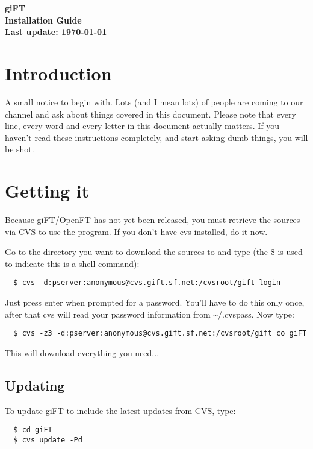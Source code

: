 \documentclass[10pt]{article}
\begin{document}
\begin{center}
\textsf{\textbf{\Huge{giFT}\\ \huge{Installation Guide}\\
\normalsize{Last update: \today}}}
\end{center}

\tableofcontents

\setlength{\parskip}{1.4ex}

\section{Introduction}
A small notice to begin with. Lots (and I mean lots) of people are
coming to our channel and ask about things covered in this
document. Please note that every line, every word and every letter
in this document actually matters. If you haven't read these
instructions completely, and start asking dumb things, you will be
shot.

\section{Getting it}

Because giFT/OpenFT has not yet been released, you must retrieve
the sources via CVS to use the program. If you don't have cvs
installed, do it now.

Go to the directory you want to download the sources to and type
(the \$ is used to indicate this is a shell command):

\begin{verbatim}
  $ cvs -d:pserver:anonymous@cvs.gift.sf.net:/cvsroot/gift login
\end{verbatim}

Just press enter when prompted for a password. You'll have to do
this only once, after that cvs will read your password information
from \~{}/.cvspass.  Now type:

\begin{verbatim}
  $ cvs -z3 -d:pserver:anonymous@cvs.gift.sf.net:/cvsroot/gift co giFT
\end{verbatim}

This will download everything you need...

\subsection{Updating}
To update giFT to include the latest updates from CVS, type:

\begin{verbatim}
  $ cd giFT
  $ cvs update -Pd
\end{verbatim}
\end{document}
